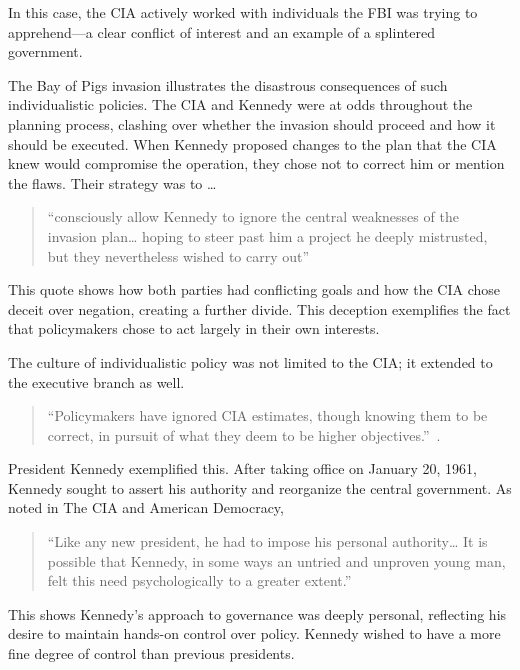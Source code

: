 \documentclass[12pt, draft]{article}
\begin{document}
    In this case, the CIA actively worked with individuals the FBI was trying to apprehend—a clear conflict of interest and an example of a splintered government.

    The Bay of Pigs invasion illustrates the disastrous consequences of such individualistic policies. The CIA and Kennedy were at odds throughout the planning process, clashing over whether the invasion should proceed and how it should be executed. When Kennedy proposed changes to the plan that the CIA knew would compromise the operation, they chose not to correct him or mention the flaws. Their strategy was to \ldots
    
    \begin{quotation}
        ``consciously allow Kennedy to ignore the central weaknesses of the invasion plan… hoping to steer past him a project he deeply mistrusted, but they nevertheless wished to carry out'' \parencite{Vandenbroucke1984} 
    \end{quotation}
    
    This quote shows how both parties had conflicting goals and how the CIA chose deceit over negation, creating a further divide. This deception exemplifies the fact that policymakers chose to act largely in their own interests.

    The culture of individualistic policy was not limited to the CIA; it extended to the executive branch as well. 

    \begin{quote}
        ``Policymakers have ignored CIA estimates, though knowing them to be correct, in pursuit of what they deem to be higher objectives.''~\parencite{JeffreysJones2003}.
    \end{quote}
    
    President Kennedy exemplified this. After taking office on January 20, 1961, Kennedy sought to assert his authority and reorganize the central government. As noted in The CIA and American Democracy, 

    \begin{quotation}
        ``Like any new president, he had to impose his personal authority… It is possible that Kennedy, in some ways an untried and unproven young man, felt this need psychologically to a greater extent.''~\parencite{JeffreysJones2003}
    \end{quotation}  

    This shows Kennedy's approach to governance was deeply personal, reflecting his desire to maintain hands-on control over policy. Kennedy wished to have a more fine degree of control than previous presidents.
\end{document}
